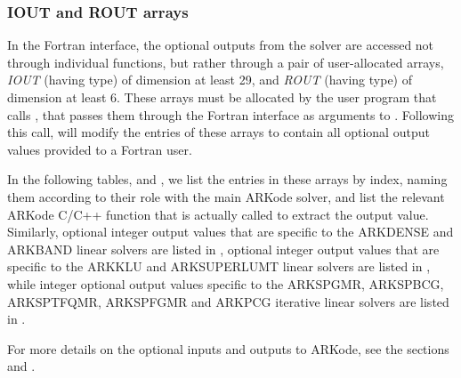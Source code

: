 \documentclass[letterpaper,10pt,english]{sphinxmanual}
\begin{document}
\subsubsection{IOUT and ROUT arrays}
\label{f_interface/Optional_output:iout-and-rout-arrays}
In the Fortran interface, the optional outputs from the
{\hyperref[f_interface/Usage:f/_/FARKODE]{\emph{}}} solver are accessed not through individual
functions, but rather through a pair of user-allocated arrays, \emph{IOUT}
(having  type) of dimension at least 29, and \emph{ROUT}
(having  type) of dimension at least 6.  These arrays must
be allocated by the user program that calls {\hyperref[f_interface/Usage:f/_/FARKODE]{\emph{}}}, that
passes them through the Fortran interface as arguments to
{\hyperref[f_interface/Usage:f/_/FARKMALLOC]{\emph{}}}.  Following this call, {\hyperref[f_interface/Usage:f/_/FARKODE]{\emph{}}} will
modify the entries of these arrays to contain all optional output
values provided to a Fortran user.

In the following tables, {\hyperref[f_interface/Optional_output:finterface-iouttable]{\emph{}}} and
{\hyperref[f_interface/Optional_output:finterface-routtable]{\emph{}}}, we list the entries in these
arrays by index, naming them according to their role with the main
ARKode solver, and list the relevant ARKode C/C++ function that is
actually called to extract the output value.  Similarly, optional
integer output values that are specific to the ARKDENSE and ARKBAND
linear solvers are listed in {\hyperref[f_interface/Optional_output:finterface-dlsiouttable]{\emph{}}}, optional
integer output values that are specific to the ARKKLU and ARKSUPERLUMT
linear solvers are listed in {\hyperref[f_interface/Optional_output:finterface-slsiouttable]{\emph{}}}, while
integer optional output values specific to the ARKSPGMR,
ARKSPBCG, ARKSPTFQMR, ARKSPFGMR and ARKPCG iterative linear solvers
are listed in {\hyperref[f_interface/Optional_output:finterface-spilsiouttable]{\emph{}}}.

For more details on the optional inputs and outputs to ARKode, see
the sections {\hyperref[c_interface/User_callable:cinterface-optionalinputs]{\emph{}}} and
{\hyperref[c_interface/User_callable:cinterface-optionaloutputs]{\emph{}}}.
\end{document}

